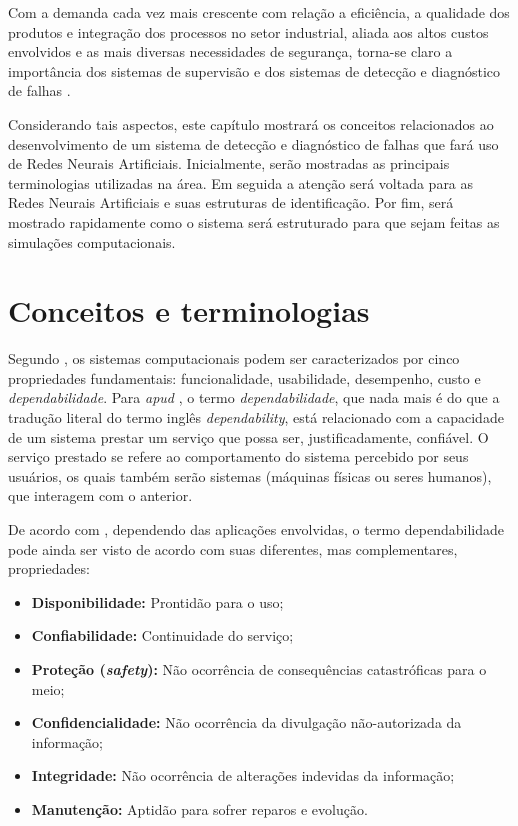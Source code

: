 \label{cap:aspectos}

Com a demanda cada vez mais crescente com relação a eficiência, a qualidade dos
produtos e integração dos processos no setor industrial, aliada aos altos custos
envolvidos e as mais diversas necessidades de segurança, torna-se claro a
importância dos sistemas de supervisão e dos sistemas de detecção e diagnóstico
de falhas \cite{isermann:2006}.

Considerando tais aspectos, este capítulo mostrará os conceitos relacionados ao
desenvolvimento de um sistema de detecção e diagnóstico de falhas que fará uso
de Redes Neurais Artificiais. Inicialmente, serão mostradas as principais
terminologias utilizadas na área. Em seguida a atenção será voltada para as
Redes Neurais Artificiais e suas estruturas de identificação. Por fim, será
mostrado rapidamente como o sistema será estruturado para que sejam feitas as
simulações computacionais.

\section{Conceitos e terminologias}\label{sec:propriedades}
Segundo , os sistemas computacionais podem ser
caracterizados por cinco propriedades fundamentais: funcionalidade, usabilidade,
desempenho, custo e {\it dependabilidade}. Para  {\it
apud} , o termo {\it dependabilidade}, que nada mais é
do que a tradução literal do termo inglês {\it dependability}, está relacionado
com a capacidade de um sistema prestar um serviço que possa ser,
justificadamente, confiável. O serviço prestado se refere ao comportamento do
sistema percebido por seus usuários, os quais também serão sistemas (máquinas
físicas ou seres humanos), que interagem com o anterior.

De acordo com , dependendo das aplicações envolvidas, o
termo dependabilidade pode ainda ser visto de acordo com suas diferentes, mas
complementares, propriedades:

\begin{itemize}
    \item {\bf Disponibilidade:} Prontidão para o uso;
    \item {\bf Confiabilidade:} Continuidade do serviço;
    \item \textbf{Proteção (\textit{safety}):} Não ocorrência de consequências
          catastróficas para o meio;
    \item {\bf Confidencialidade:} Não ocorrência da divulgação não-autorizada
          da informação;
    \item {\bf Integridade:} Não ocorrência de alterações indevidas da
          informação;
    \item {\bf Manutenção:} Aptidão para sofrer reparos e evolução.
\end{itemize}

